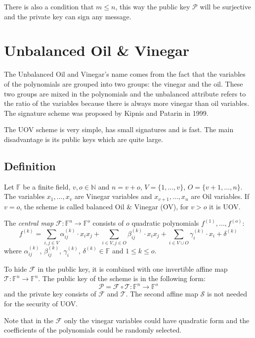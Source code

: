 \documentclass[thesis=M,english]{FITthesis}[2019/12/23]
\begin{document}
There is also a condition that $m \leq n$, this way the public key $\mathcal{P}$ will be surjective and the private key can sign any message.

\section{Unbalanced Oil \& Vinegar}
The Unbalanced Oil and Vinegar's name comes from the fact that the variables of the polynomials are grouped into two groups: the vinegar and the oil. These two groups are mixed in the polynomials and the unbalanced attribute refers to the ratio of the variables because there is always more vinegar than oil variables. The signature scheme was proposed by Kipnis and Patarin in 1999.

\bigskip
\noindent
The UOV scheme is very simple, has small signatures and is fast. The main disadvantage is its public keys which are quite large.

\subsection{Definition}
Let $\mathbb{F}$ be a finite field, $v,o \in \mathbb{N}$ and $n=v+o$, $V=\{1, \ldots, v\}$, $O=\{v+1, \ldots, n\}$. The variables $x_1, \ldots, x_v$ are Vinegar variables and $x_{v+1}, \ldots, x_n$ are Oil variables. If $v=o$, the scheme is called balanced Oil \& Vinegar (OV), for $v>o$ it is UOV.

\bigskip
\noindent
The \textit{central map} $\mathcal{F}:\mathbb{F}^n \rightarrow \mathbb{F}^o$ consists of $o$ quadratic polynomials $f^{(1)}, \ldots, f^{(o)}$:
\[
f^{(k)} = \sum\limits_{i,j \in V}{\alpha_{ij}^{(k)} \cdot x_ix_j} + \sum\limits_{i \in V,j \in O}{\beta_{ij}^{(k)} \cdot x_ix_j}+ \sum\limits_{i \in V \cup O}{\gamma_{i}^{(k)} \cdot x_i} + \delta^{(k)}
\]
where $\alpha_{ij}^{(k)}$, $\beta_{ij}^{(k)}$, $\gamma_{i}^{(k)}$, $\delta^{(k)} \in \mathbb{F}$ and $1 \leq k \leq o$.

\bigskip
\noindent
To hide $\mathcal{F}$ in the public key, it is combined with one invertible affine map $\mathcal{T}: \mathbb{F}^n \rightarrow \mathbb{F}^n$. The public key of the scheme is in the following form:
\[
\mathcal{P} = \mathcal{F} \circ \mathcal{T} : \mathbb{F}^n \rightarrow \mathbb{F}^o
\]
and the private key consists of $\mathcal{F}$ and $\mathcal{T}$. The second affine map $\mathcal{S}$ is not needed for the security of UOV.

\bigskip
\noindent
Note that in the $\mathcal{F}$ only the vinegar variables could have quadratic form and the coefficients of the polynomials could be randomly selected.
\end{document}
